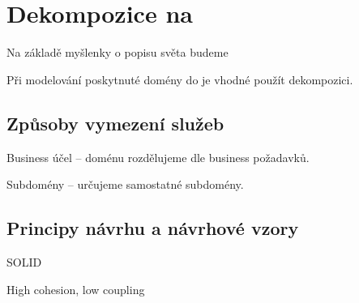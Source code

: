 \section{Dekompozice na }\label{sec:msa-decomposition}

Na základě myšlenky o popisu světa budeme


Při modelování poskytnuté domény do  je vhodné použít dekompozici.



\subsection{Způsoby vymezení služeb}\label{subsec:msa-decomposition-methods}

Business účel – doménu rozdělujeme dle business požadavků.

Subdomény – určujeme samostatné subdomény.



\subsection{Principy návrhu a návrhové vzory}\label{subsec:msa-decomposition-principles}

SOLID

High cohesion, low coupling
